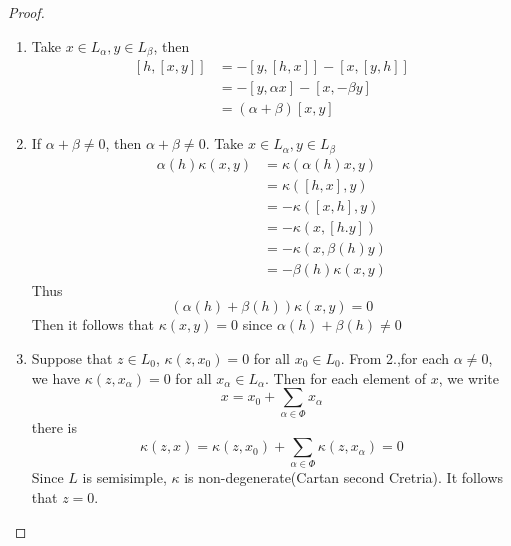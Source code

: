\documentclass[../main.tex]{subfiles}
\begin{document}
\begin{proof}
    \begin{enumerate}
        \item Take \(  x\in L_{\alpha }, y \in L_{\beta }  \), then \[
        \begin{aligned}
        \left[ h,\left[ x,y \right]  \right]&= -\left[ y,\left[ h,x \right]  \right]-\left[ x,\left[ y,h \right]  \right]\\ 
            &= -\left[ y, \alpha  x \right] -\left[ x, -\beta y \right]\\ 
             &=  \left( \alpha + \beta  \right) [x,y]
        \end{aligned}   
        \]
        \item If \(  \alpha + \beta \neq 0  \), then \( \alpha + \beta \neq 0   \).  Take \(  x \in L_{\alpha }, y \in L_{\beta }  \) \[
      \begin{aligned}
        \alpha \left( h \right)  \kappa \left( x,y \right)&=  \kappa \left( \alpha \left( h \right)x,y  \right)\\ 
         &=  \kappa \left( \left[ h,x \right],y  \right)\\ 
          &=  - \kappa \left( \left[ x,h \right],y  \right)\\ 
           &= - \kappa \left( x,\left[ h.y \right]  \right)\\ 
            &= - \kappa \left( x, \beta \left( h \right)y  \right)\\ 
             &= -\beta \left( h \right) \kappa \left( x,y \right)     
      \end{aligned}   
        \] Thus  \[
        \left( \alpha \left( h \right)+ \beta \left( h \right)   \right) \kappa \left( x,y \right)= 0  
        \]Then it follows that \(   \kappa \left( x,y \right)= 0  \) since \(  \alpha \left( h \right)+ \beta \left( h \right)\neq 0     \)  
        \item Suppose that \(  z \in L_0  \), \(   \kappa \left( z,x_0 \right)= 0   \) for all \(  x_0 \in L_0  \). From 2.,for each \(  \alpha \neq 0  \), we have \(   \kappa \left( z, x_{\alpha } \right)= 0   \) for all \(  x_{\alpha }\in L_{\alpha }  \). Then for each element of       \(  x  \), we write \[
        x= x_0+ \sum _{\alpha  \in \Phi }x_{\alpha }
        \]there is \[
         \kappa \left( z,x \right)=  \kappa \left( z,x_0 \right)+ \sum _{\alpha \in \Phi } \kappa \left( z,x_{\alpha } \right)   = 0
        \] Since \(  L  \) is semisimple, \(   \kappa   \) is non-degenerate(Cartan second Cretria). It follows that \(  z= 0  \).   
    \end{enumerate}
    
\end{proof}
\end{document}
